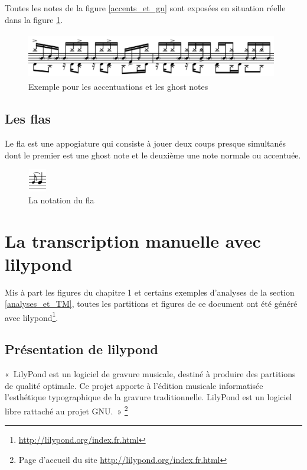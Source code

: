 Toutes les notes de la figure \ref{accents_et_gn} sont exposées en situation
réelle dans la figure \ref{exemple_acc_et_gn}. 
\begin{figure}[h]
\centering
\includegraphics[height=20mm, width=110mm]{
z_images/3_methodes/0_notation_de_la_batterie/8_accents_et_ghost-notes_1.png}
\caption{Exemple pour les accentuations et les ghost notes}
\label{exemple_acc_et_gn}
\end{figure}

\subsection*{Les flas}
Le fla est une appogiature qui consiste à jouer deux coups presque simultanés dont
le premier est une ghost note et le deuxième une note normale ou accentuée.
\begin{figure}[h]
    \centering
    \includegraphics[height=10mm, width=8mm]{
    z_images/3_methodes/0_notation_de_la_batterie/fla_def.png}
    \caption{La notation du fla}
\end{figure}

\section{La transcription manuelle avec lilypond}
\label{tm}
Mis à part les figures du chapitre 1 et certains exemples d’analyses de la
section \ref{analyses_et_TM}, toutes les partitions et figures de ce document
ont été généré avec lilypond\footnote{\url{http://lilypond.org/index.fr.html}}.\\

\subsection*{Présentation de lilypond}
«~LilyPond est un logiciel de gravure musicale, destiné à produire des
partitions de qualité optimale. Ce projet apporte à l’édition musicale
informatisée l’esthétique typographique de la gravure traditionnelle. LilyPond
est un logiciel libre rattaché au projet GNU.~» \footnote{Page d’accueil du site \url{http://lilypond.org/index.fr.html}}\\

